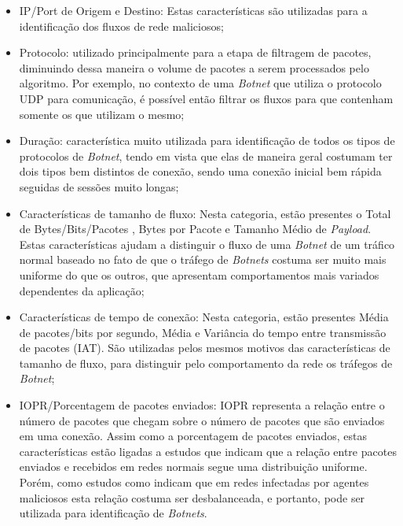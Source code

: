 \begin{itemize}
    \item IP/Port de Origem e Destino: Estas características são utilizadas para a identificação dos fluxos de rede maliciosos;
    \item Protocolo: utilizado principalmente para a etapa de filtragem de pacotes, diminuindo dessa maneira o volume de pacotes a serem processados pelo algoritmo. Por exemplo, no contexto de uma \textit{Botnet} que utiliza o protocolo UDP para comunicação, é possível então filtrar os fluxos para que contenham somente os que utilizam o mesmo;
    \item Duração: característica muito utilizada para identificação de todos os tipos de protocolos de \textit{Botnet}, tendo em vista que elas de maneira geral costumam ter dois tipos bem distintos de conexão, sendo uma conexão inicial bem rápida seguidas de sessões muito longas;
    \item Características de tamanho de fluxo: Nesta categoria, estão presentes o Total de Bytes/Bits/Pacotes , Bytes por Pacote e Tamanho Médio de \textit{Payload}. Estas características ajudam a distinguir o fluxo de uma \textit{Botnet} de um tráfico normal baseado no fato de que o tráfego de \textit{Botnets} costuma ser muito mais uniforme do que os outros, que apresentam comportamentos mais variados dependentes da aplicação;
    \item Características de tempo de conexão: Nesta categoria, estão presentes Média de pacotes/bits por segundo, Média e Variância do tempo entre transmissão de pacotes (IAT). São utilizadas pelos mesmos motivos das características de tamanho de fluxo, para distinguir pelo comportamento da rede os tráfegos de \textit{Botnet};
    \item IOPR/Porcentagem de pacotes enviados: IOPR representa a relação entre o número de pacotes que chegam sobre o número de pacotes que são enviados em uma conexão. Assim como a porcentagem de pacotes enviados, estas características estão ligadas a estudos que indicam que a relação entre pacotes enviados e recebidos em redes normais segue uma distribuição uniforme. Porém, como estudos como \cite{almgren2010tracking} indicam que em redes infectadas por agentes maliciosos esta relação costuma ser desbalanceada, e portanto, pode ser utilizada para identificação de \textit{Botnets}.
\end{itemize}


